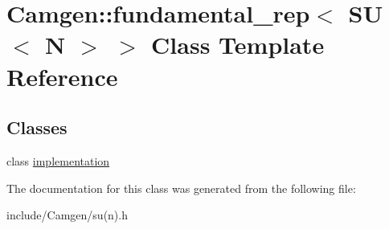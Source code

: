 \hypertarget{a00233}{\section{Camgen\-:\-:fundamental\-\_\-rep$<$ S\-U$<$ N $>$ $>$ Class Template Reference}
\label{a00233}
}
\subsection*{Classes}
\begin{DoxyCompactItemize}
\item 
class \hyperlink{a00285}{implementation}
\end{DoxyCompactItemize}


The documentation for this class was generated from the following file\-:\begin{DoxyCompactItemize}
\item 
include/\-Camgen/su(n).\-h\end{DoxyCompactItemize}
